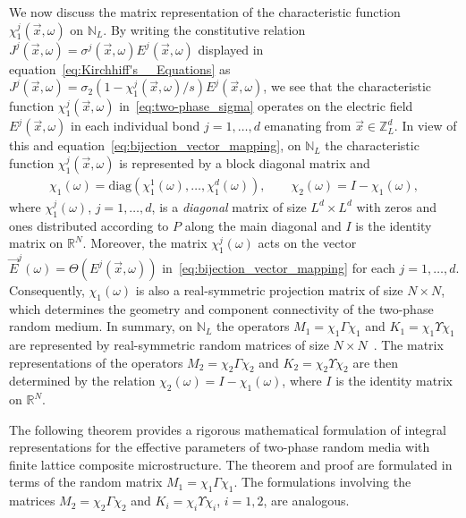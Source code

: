 \documentclass{cmslatex}
\begin{document}
We now discuss the matrix representation of the characteristic
function $\chi_1^j(\vec{x},\omega)$ on $\mathbb{N}_L$. By writing the
constitutive relation $J^j(\vec{x},\omega)=\sigma^j(\vec{x},\omega)E^j(\vec{x},\omega)$
displayed in equation~\eqref{eq:Kirchhiff's__Equations} as
$J^j(\vec{x},\omega)=\sigma_2(1-\chi_1^j(\vec{x},\omega)/s)E^j(\vec{x},\omega)$, 
we see that the characteristic
function $\chi_1^j(\vec{x},\omega)$ in~\eqref{eq:two-phase_sigma} operates
on the electric field
$E^j(\vec{x},\omega)$ in each individual bond $j=1,\ldots,d$ emanating from
$\vec{x}\in\mathbb{Z}_L^d$. In view of this and
equation~\eqref{eq:bijection_vector_mapping}, on 
$\mathbb{N}_L$ the characteristic function $\chi_1^j(\vec{x},\omega)$ is
represented by a block diagonal matrix and
%
\begin{align}\label{eq:block_diag_chi}  
  \chi_1(\omega)=\text{diag}(\chi_1^1(\omega),\ldots,\chi_1^d(\omega)), \qquad
  \chi_2(\omega)=I-\chi_1(\omega),
\end{align}
%
where $\chi_1^j(\omega)$, $j=1,\ldots,d$, is a \emph{diagonal} matrix of size $L^d\times
L^d$ with zeros and ones distributed according to $P$ along the main
diagonal and $I$ is the identity matrix on $\mathbb{R}^N$. Moreover,
the matrix $\chi_1^j(\omega)$ acts on the vector 
$\vec{E}^j(\omega)=\Theta(E^j(\vec{x},\omega))$
in~\eqref{eq:bijection_vector_mapping} for each
$j=1,\ldots,d$. Consequently,  
$\chi_1(\omega)$ is also a real-symmetric projection matrix of size $N\times N$,
which determines the geometry and component connectivity of the
two-phase random medium. In summary, on $\mathbb{N}_L$ the operators
$M_1=\chi_1\Gamma\chi_1$ and $K_1=\chi_1\Upsilon\chi_1$ are represented by real-symmetric
random matrices of size
$N\times N$~\cite{Golden:JBM:337,Murphy:JMP:063506}. The matrix  
representations of the operators $M_2=\chi_2\Gamma\chi_2$ and $K_2=\chi_2\Upsilon\chi_2$ are
then determined by the relation $\chi_2(\omega)=I-\chi_1(\omega)$, where $I$ is the
identity matrix on $\mathbb{R}^N$.





The following theorem provides a rigorous mathematical formulation of
integral representations for the effective parameters of two-phase
random media with finite lattice composite microstructure. The theorem
and proof are formulated in terms of the random matrix
$M_1=\chi_1\Gamma\chi_1$. The formulations involving the matrices $M_2=\chi_2\Gamma\chi_2$
and $K_i=\chi_i\Upsilon\chi_i$, $i=1,2$, are analogous.  
\end{document}

